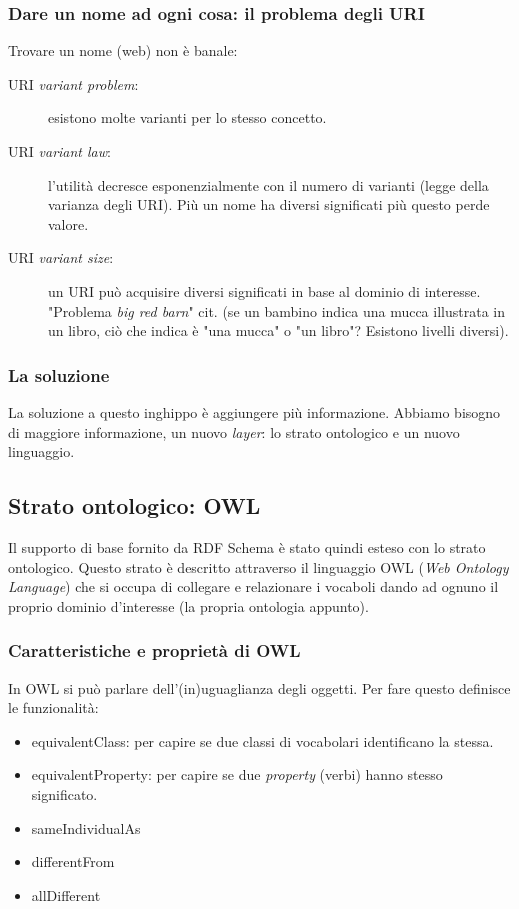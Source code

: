 			\subsubsection{Dare un nome ad ogni cosa: il problema degli URI}
				Trovare un nome (web) non è banale:
				\begin{description}
					\item[URI \emph{variant problem}:] esistono molte varianti per lo stesso concetto.
					\item[URI \emph{variant law}:] l'utilità decresce esponenzialmente con il numero di varianti (legge della varianza degli URI). Più un nome ha diversi significati più questo perde valore.
					\item[URI \emph{variant size}:] un URI può acquisire diversi significati in base al dominio di interesse. "Problema \emph{big red barn}" cit. (se un bambino indica una mucca illustrata in un libro, ciò che indica è "una mucca" o "un libro"? Esistono livelli diversi).
				\end{description}				
			
			\subsubsection{La soluzione}
				La soluzione a questo inghippo è aggiungere più informazione. Abbiamo bisogno di maggiore informazione, un nuovo \emph{layer}: lo strato ontologico e un nuovo linguaggio.
		
		\subsection{Strato ontologico: OWL}
			Il supporto di base fornito da RDF Schema è stato quindi esteso con lo strato ontologico. Questo strato è descritto attraverso il linguaggio OWL (\emph{Web Ontology Language}) che si occupa di collegare e relazionare i vocaboli dando ad ognuno il proprio dominio d'interesse (la propria ontologia appunto).
		
			\subsubsection{Caratteristiche e proprietà di OWL}
				In OWL si può parlare dell'(in)uguaglianza degli oggetti. Per fare questo definisce le funzionalità:
					\begin{itemize}
						\item equivalentClass: per capire se due classi di vocabolari identificano la stessa.
						\item equivalentProperty: per capire se due \emph{property} (verbi) hanno stesso significato.
						\item sameIndividualAs
						\item differentFrom
						\item allDifferent
					\end{itemize}
					
